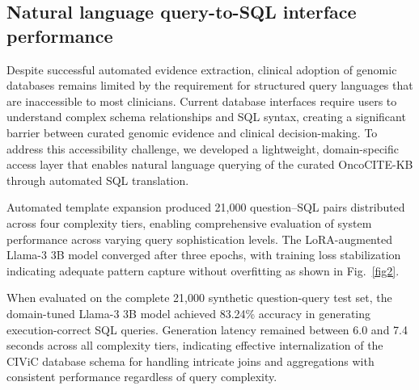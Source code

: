 % 
%
%

\subsection{Natural language query-to-SQL interface performance}\label{subsec4}

Despite successful automated evidence extraction, clinical adoption of genomic databases remains limited by the requirement for structured query languages that are inaccessible to most clinicians. Current database interfaces require users to understand complex schema relationships and SQL syntax, creating a significant barrier between curated genomic evidence and clinical decision-making. To address this accessibility challenge, we developed a lightweight, domain-specific access layer that enables natural language querying of the curated OncoCITE-KB through automated SQL translation.

Automated template expansion produced 21,000 question--SQL pairs distributed across four complexity tiers, enabling comprehensive evaluation of system performance across varying query sophistication levels. The LoRA-augmented Llama-3 3B model converged after three epochs, with training loss stabilization indicating adequate pattern capture without overfitting as shown in Fig.~\ref{fig2}.

When evaluated on the complete 21,000 synthetic question-query test set, the domain-tuned Llama-3 3B model achieved 83.24\% accuracy in generating execution-correct SQL queries. Generation latency remained between 6.0 and 7.4 seconds across all complexity tiers, indicating effective internalization of the CIViC database schema for handling intricate joins and aggregations with consistent performance regardless of query complexity.

